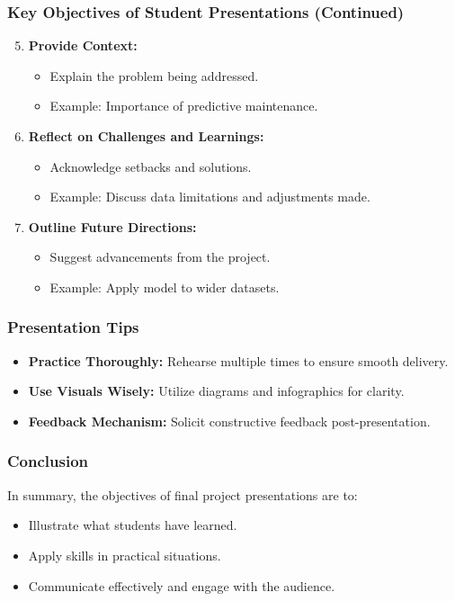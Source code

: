 \documentclass[aspectratio=169]{beamer}
\begin{document}
\begin{frame}[fragile]
    \frametitle{Key Objectives of Student Presentations (Continued)}
    \begin{enumerate}
        \setcounter{enumi}{4}
        \item \textbf{Provide Context:}
            \begin{itemize}
                \item Explain the problem being addressed.
                \item Example: Importance of predictive maintenance.
            \end{itemize}
        
        \item \textbf{Reflect on Challenges and Learnings:}
            \begin{itemize}
                \item Acknowledge setbacks and solutions.
                \item Example: Discuss data limitations and adjustments made.
            \end{itemize}

        \item \textbf{Outline Future Directions:}
            \begin{itemize}
                \item Suggest advancements from the project.
                \item Example: Apply model to wider datasets.
            \end{itemize}
    \end{enumerate}
\end{frame}

\begin{frame}[fragile]
    \frametitle{Presentation Tips}
    \begin{itemize}
        \item \textbf{Practice Thoroughly:} Rehearse multiple times to ensure smooth delivery.
        \item \textbf{Use Visuals Wisely:} Utilize diagrams and infographics for clarity.
        \item \textbf{Feedback Mechanism:} Solicit constructive feedback post-presentation.
    \end{itemize}
\end{frame}

\begin{frame}[fragile]
    \frametitle{Conclusion}
    In summary, the objectives of final project presentations are to:
    \begin{itemize}
        \item Illustrate what students have learned.
        \item Apply skills in practical situations.
        \item Communicate effectively and engage with the audience.
    \end{itemize}
\end{frame}
\end{document}
